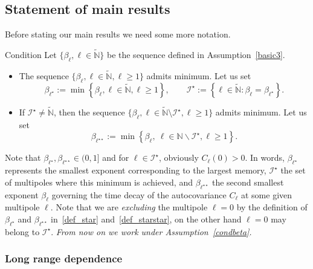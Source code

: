 \documentclass[10pt]{amsart}
\theoremstyle{definition}\newtheorem{defi}[theo]{Definition}\newtheorem{rema}[theo]{Remark}\newtheorem{exam}[theo]{Example}\newtheorem{exem}[theo]{Example}\newtheorem{nota}[theo]{Notation}
\newcommand{\clI}{\mathcal{I}}
\newcommand{\bbN}{\mathbb{N}}
\begin{document}
\subsection{Statement of main results}

Before stating our main results we need some more notation.

\begin{enonce}{Condition}\label{condbeta}
Let $\{ \beta_\ell, \ell \in \widetilde{\bbN}
\}$ be the sequence defined in Assumption~\ref{basic3}.
\begin{itemize}
\item The sequence $\{ \beta_\ell, \ell \in \widetilde{\bbN},
\ell\ge 1\}$ admits minimum. Let us set
\begin{equation}\label{def_star}
\beta_{\ell ^{\star }}:=\min\left\{ \beta _{\ell }, \ell \in \widetilde{
\bbN},\ell\ge 1\right\},\qquad \clI^{\star }:=\left\{\ell\in
\widetilde{\bbN} :\beta _{\ell }=\beta _{\ell ^{\star }}\right\}.
\end{equation}

\item If $\clI^\star\ne \widetilde{\bbN}$, then the sequence $
\{ \beta_\ell, \ell\in \widetilde{\bbN} \setminus \clI ^\star,\ell\ge 1\}$ admits minimum. Let us set
\begin{equation}\label{def_starstar}
\beta_{\ell ^{\star \star }}:=\min \left\{ \beta _{\ell },\ \ell \in \bbN\backslash \clI^{\star },\ell\ge 1\right\}.
\end{equation}
\end{itemize}
\end{enonce}

Note that $\beta_{\ell^\star}, \beta_{\ell^{\star\star}}\in (0,1]$ and for $
\ell\in \clI^\star$, obviously $C_{\ell}(0)> 0$. In words, $\beta _{\ell ^{\star }}$ represents the smallest exponent corresponding to the largest memory, $\clI^{\star }$ the set of multipoles where this minimum is achieved, and $\beta _{\ell ^{\star \star }}$ the second smallest exponent $\beta _{\ell }$ governing the time decay of the autocovariance $ C_\ell$ at some given multipole $\ell$. Note that we are \emph{excluding} the multipole $\ell =0$ by the definition of $\beta_{\ell^\star}$ and $
\beta_{\ell^{\star\star}}$ in~\eqref{def_star} and~\eqref{def_starstar}, on the other hand $\ell=0$ may belong to $\clI^\star$. \emph{From now on we work under Assumption~\ref{condbeta}.}



\subsubsection{Long range dependence}
\end{document}
